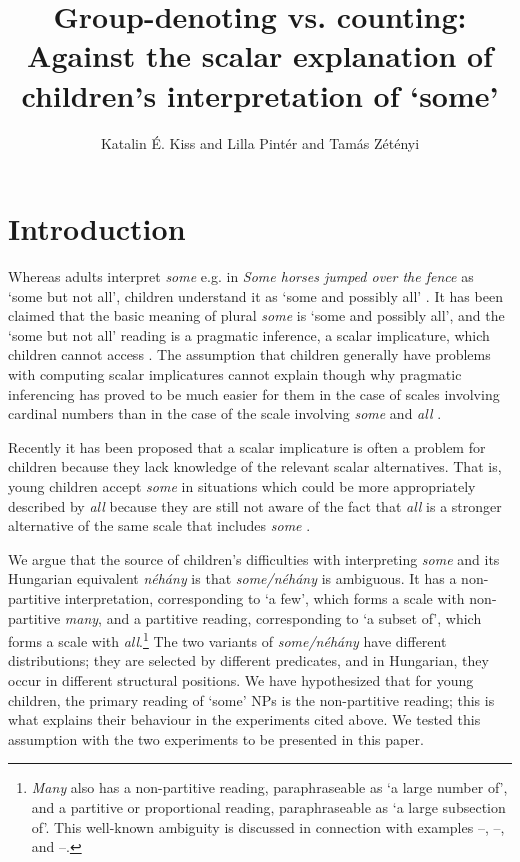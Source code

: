 \documentclass[output=paper]{langscibook}
\author{Katalin É. Kiss\affiliation{Research Institute for Linguistics} and Lilla Pintér\affiliation{Pázmány Péter Catholic University, Research Institute for Linguistics} and  Tamás Zétényi\affiliation{Budapest University of Technology and Economics}}
\title[Group-denoting vs. counting]{Group-denoting vs. counting: Against the scalar explanation of children's interpretation of `some'}
\begin{document}
\maketitle


\section{Introduction}\label{kis-zet:sec:introduction}

Whereas adults interpret \textit{some} e.g. in  \textit{Some horses jumped over the fence} as `some but not all', children understand it as `some and possibly all' \citep[e.g.][]{noveck2001children,papafragou2004children}. It has been claimed that the basic meaning of plural \textit{some} is `some and possibly all', and the `some but not all' reading is a pragmatic inference, a scalar implicature, which children cannot access \citep[see][]{noveck2001children,chierchia2001acquisition,papafragou2003scalar,guasti2005children,foppolo2012scalar,huang2009online,katsos2011pragmatic,barner2011accessing}. The assumption that children generally have problems with computing scalar implicatures cannot explain though why pragmatic inferencing has proved to be much easier for them in the case of scales involving cardinal numbers than in the case of the scale involving \textit{some} and \textit{all} \citep{papafragou2003scalar}.

Recently it has been proposed that a scalar implicature is often a problem for children because they lack knowledge of the relevant scalar alternatives. That is, young children accept \textit{some} in situations which could be more appropriately described by \textit{all} because they are still not aware of the fact that \textit{all} is a stronger alternative of the same scale that includes \textit{some} \citep{barner2011accessing,foppolo2012scalar,pagliarini2018children}.

We argue that the source of children's difficulties with interpreting \textit{some} and its Hungarian equivalent \textit{néhány} is that \textit{some/néhány} is ambiguous. It has a non-partitive interpretation, corresponding to `a few', which forms a scale with non-partitive \textit{many}, and a partitive reading, corresponding to `a subset of', which forms a scale with \textit{all}.\footnote{\textit{Many} also has a non-partitive reading, paraphraseable as `a large number of', and a partitive or proportional reading, paraphraseable as `a large subsection of'. This well-known ambiguity is discussed in connection with examples --, --, and --.} The two variants of \textit{some/néhány} have different distributions; they are selected by different predicates, and in Hungarian, they occur in different structural positions. We have hypothesized that for young children, the primary reading of `some' NPs is the non-partitive reading; this is what explains their behaviour in the experiments cited above. We tested this assumption with the two experiments to be presented in this paper.
\end{document}
